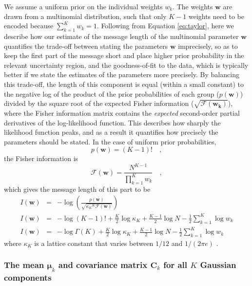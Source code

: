 \documentclass{elsarticle}
\newcommand{\vect}[1]{\boldsymbol{\mathbf{#1}}}
\renewcommand{\vec}[1]{\vect{#1}}
\def\cov{C}
\def\veccov{\vect{\cov}}
\def\vecmean{\vect{\mu}}
\def\weight{w}
\def\weights{\vect{\weight}}
\newcommand{\fisher}[1]{\mathcal{F}\left(#1\right)}
\newcommand{\prior}[1]{p\left(#1\right)}
\begin{document}
We assume a uniform prior on the individual weights $\weight_{k}$. The weights
$\weights$ are drawn from a multinomial distribution, such that only $K - 1$
weights need to be encoded because $\sum_{k=1}^{K}\weight_k = 1$. Following
from Equation \ref{eq:taylor}, here we describe how our estimate of the message 
length of the multinomial parameter $\vec{\weight}$ quantifies the trade-off 
between stating the parameters $\vec{\weights}$ imprecisely, so as to keep the 
first part of the message short and place higher prior probability in the 
relevant uncertainty region, and the goodness-of-fit to the data, which is 
typically better if we state the estimates of the parameters more precisely. 
By balancing this trade-off, the length of this component is equal (within a 
small constant) to the negative log of the product of the prior probabilities 
of each group ($\prior{\vec{\weight}}$) divided by the square root of the 
expected Fisher information ($\sqrt{\fisher{\vec{\weight_k}}}$), where the 
Fisher information matrix contains the \emph{expected} second-order partial 
derivatives of the log-likelihood function. This describes how sharply the 
likelihood function peaks, and as a result it quantifies how precisely the 
parameters should be stated. In the case of uniform prior probabilities,
\begin{equation}
    \prior{\vec{\weight}} = (K - 1)! \quad ,
\end{equation}
\noindent{}the Fisher information is
\begin{equation}
\fisher{\vec{w}} = \frac{N^{K - 1}}{\prod_{k=1}^{K} w_k} \quad ,
\end{equation}
\noindent{}which gives the message length of this part to be
\begin{eqnarray}
I(\vec{w}) &=& -\log\left(\frac{\prior{\vec{w}}}{\sqrt{{\kappa_K}^K \fisher{\vec{w}}}}\right)  \nonumber \\
I(\vec{w}) &=& -\log{(K - 1)!} + \frac{K}{2}\log{\kappa_K} + \frac{K-1}{2}\log{N} - \frac{1}{2}\sum_{k=1}^{K}\log{\weight_k} \nonumber \\
I(\vec{w}) &=& -\log{\Gamma(K)} + \frac{K}{2}\log{\kappa_K} + \frac{K-1}{2}\log{N} - \frac{1}{2}\sum_{k=1}^{K}\log{\weight_k}
\end{eqnarray}
\noindent{}where $\kappa_K$ is a lattice constant that varies between $1/12$
and $1/(2\pi e)$ \cite{BoultonWallace1969}.



\subsubsection{The mean $\vecmean_k$ and covariance matrix $\veccov_k$ for all
               $K$ Gaussian components}
\end{document}

